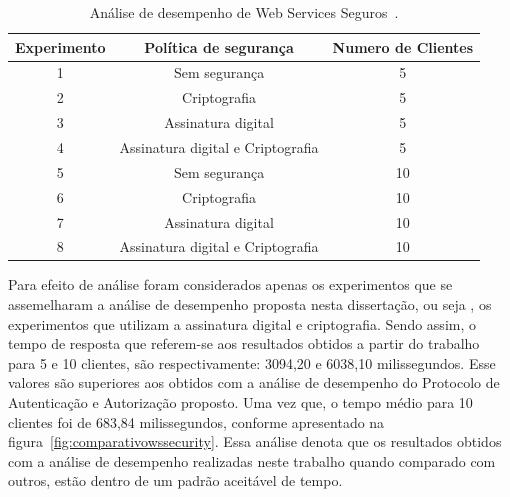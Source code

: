 \begin{table}[h]
\begin{tabular}{|c|c|c|}
\hline
\textbf{Experimento} & \textbf{Política de segurança}     & \textbf{Numero de Clientes} \\ \hline
1                    & Sem segurança                      & 5                           \\ \hline
2                    & Criptografia                       & 5                           \\ \hline
3                    & Assinatura digital                 & 5                           \\ \hline
4                    & Assinatura digital e Criptografia  & 5                           \\ \hline
5                    & Sem segurança                      & 10                           \\ \hline
6                    & Criptografia                       & 10                           \\ \hline
7                    & Assinatura digital                 & 10                           \\ \hline
8                    & Assinatura digital e Criptografia  & 10                          \\ \hline
\end{tabular}\caption {Análise de desempenho de Web Services Seguros~\cite{rodrigues2011analysis}.}\label{tb:expWSSecurity}
\end{table}

Para efeito de análise foram considerados apenas os experimentos que se assemelharam a análise de desempenho proposta nesta dissertação, ou seja , os experimentos que utilizam a assinatura digital e criptografia. Sendo assim, o tempo de resposta  que referem-se aos resultados obtidos a partir do trabalho~\cite{rodrigues2011analysis} para  5 e 10 clientes, são respectivamente: 3094,20 e 6038,10 milissegundos. Esse valores são superiores aos obtidos com a análise de desempenho do Protocolo de Autenticação e Autorização proposto. Uma vez que, o tempo médio para 10 clientes foi de 683,84 milissegundos, conforme apresentado na figura~\ref{fig:comparativowssecurity}. Essa análise denota que os resultados obtidos com a análise de desempenho realizadas neste trabalho quando comparado com outros, estão dentro de um padrão aceitável de tempo.

